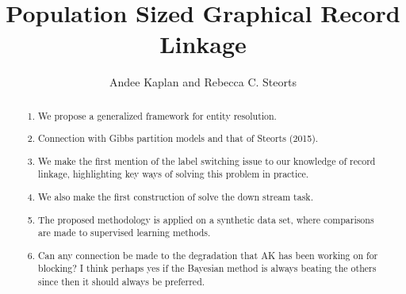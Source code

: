 \documentclass[11pt]{article}
\begin{document}
%

\title{Population Sized Graphical Record Linkage}






\author{Andee Kaplan and Rebecca C. Steorts
 }


\maketitle

\vspace*{-1em}
\begin{abstract}


\begin{enumerate}
\item We propose a generalized framework for entity resolution.
\item Connection with Gibbs partition models and that of Steorts (2015). 
\item We make the first mention of the label switching issue to our knowledge of record linkage, highlighting key ways of solving this problem in practice. 
\item We also make the first construction of solve the down stream task.
\item The proposed methodology is applied on a synthetic data set, where comparisons are made to supervised learning methods.
\item Can any connection be made to the degradation that AK has been working on for blocking? I think perhaps yes if the Bayesian method is always beating the others since then it should always be preferred. 
\end{enumerate}
\vspace*{20em}
\end{abstract}
\end{document}
